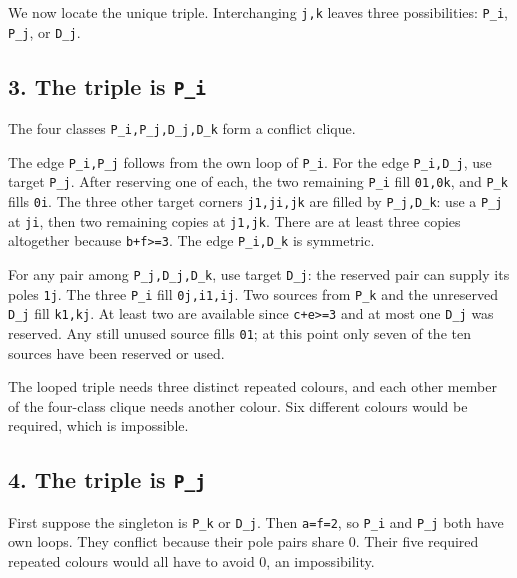 \documentclass[
  10pt,
]{article}
\begin{document}
We now locate the unique triple. Interchanging \texttt{j,k} leaves three
possibilities: \texttt{P\_i}, \texttt{P\_j}, or \texttt{D\_j}.

\hypertarget{the-triple-is-p_i}{%
\subsection*{\texorpdfstring{3. The triple is
\texttt{P\_i}}{3. The triple is P\_i}}\label{the-triple-is-p_i}}

The four classes \texttt{P\_i,P\_j,D\_j,D\_k} form a conflict clique.

The edge \texttt{P\_i,P\_j} follows from the own loop of \texttt{P\_i}.
For the edge \texttt{P\_i,D\_j}, use target \texttt{P\_j}. After
reserving one of each, the two remaining \texttt{P\_i} fill
\texttt{01,0k}, and \texttt{P\_k} fills \texttt{0i}. The three other
target corners \texttt{j1,ji,jk} are filled by \texttt{P\_j,D\_k}: use a
\texttt{P\_j} at \texttt{ji}, then two remaining copies at
\texttt{j1,jk}. There are at least three copies altogether because
\texttt{b+f\textgreater{}=3}. The edge \texttt{P\_i,D\_k} is symmetric.

For any pair among \texttt{P\_j,D\_j,D\_k}, use target \texttt{D\_j}:
the reserved pair can supply its poles \texttt{1j}. The three
\texttt{P\_i} fill \texttt{0j,i1,ij}. Two sources from \texttt{P\_k} and
the unreserved \texttt{D\_j} fill \texttt{k1,kj}. At least two are
available since \texttt{c+e\textgreater{}=3} and at most one
\texttt{D\_j} was reserved. Any still unused source fills \texttt{01};
at this point only seven of the ten sources have been reserved or used.

The looped triple needs three distinct repeated colours, and each other
member of the four-class clique needs another colour. Six different
colours would be required, which is impossible.

\hypertarget{the-triple-is-p_j}{%
\subsection*{\texorpdfstring{4. The triple is
\texttt{P\_j}}{4. The triple is P\_j}}\label{the-triple-is-p_j}}

First suppose the singleton is \texttt{P\_k} or \texttt{D\_j}. Then
\texttt{a=f=2}, so \texttt{P\_i} and \texttt{P\_j} both have own loops.
They conflict because their pole pairs share 0. Their five required
repeated colours would all have to avoid 0, an impossibility.
\end{document}
